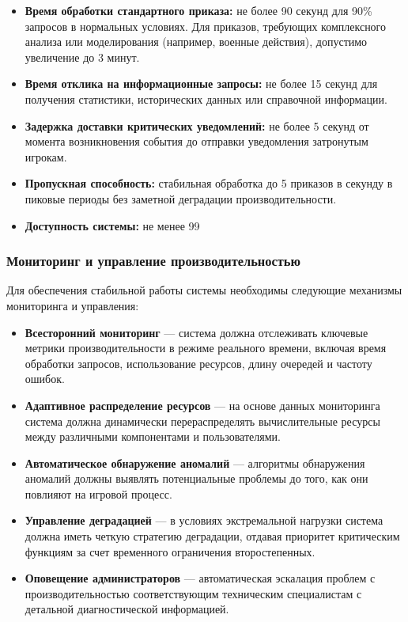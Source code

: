 \begin{itemize}
    \item \textbf{Время обработки стандартного приказа:} не более 90 секунд для 90\% запросов в нормальных условиях. Для приказов, требующих комплексного анализа или моделирования (например, военные действия), допустимо увеличение до 3 минут.

    \item \textbf{Время отклика на информационные запросы:} не более 15 секунд для получения статистики, исторических данных или справочной информации.

    \item \textbf{Задержка доставки критических уведомлений:} не более 5 секунд от момента возникновения события до отправки уведомления затронутым игрокам.

    \item \textbf{Пропускная способность:} стабильная обработка до 5 приказов в секунду в пиковые периоды без заметной деградации производительности.

    \item \textbf{Доступность системы:} не менее 99%
\end{itemize}

\subsubsection{Мониторинг и управление производительностью}

Для обеспечения стабильной работы системы необходимы следующие механизмы мониторинга и управления:

\begin{itemize}
    \item \textbf{Всесторонний мониторинг} — система должна отслеживать ключевые метрики производительности в режиме реального времени, включая время обработки запросов, использование ресурсов, длину очередей и частоту ошибок.

    \item \textbf{Адаптивное распределение ресурсов} — на основе данных мониторинга система должна динамически перераспределять вычислительные ресурсы между различными компонентами и пользователями.

    \item \textbf{Автоматическое обнаружение аномалий} — алгоритмы обнаружения аномалий должны выявлять потенциальные проблемы до того, как они повлияют на игровой процесс.

    \item \textbf{Управление деградацией} — в условиях экстремальной нагрузки система должна иметь четкую стратегию деградации, отдавая приоритет критическим функциям за счет временного ограничения второстепенных.

    \item \textbf{Оповещение администраторов} — автоматическая эскалация проблем с производительностью соответствующим техническим специалистам с детальной диагностической информацией.
\end{itemize}

